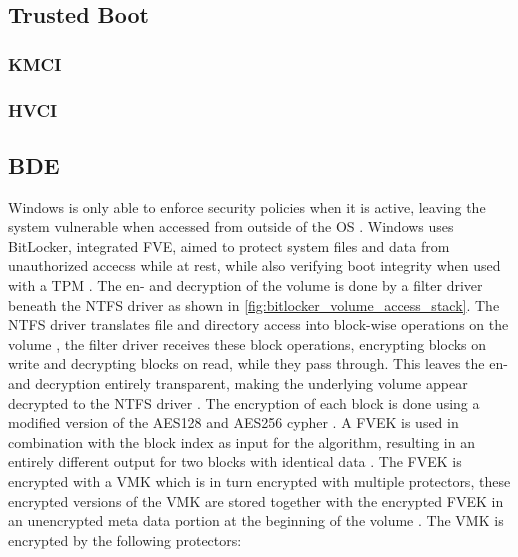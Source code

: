 \subsection{Trusted Boot}
\subsubsection{KMCI}
\subsubsection{HVCI}

\subsection{\acf{BDE}}
\label{sec:bde}
Windows is only able to enforce security policies when it is active, leaving the system vulnerable when accessed from outside of the \ac{OS} \cite[9. BitLocker Drive encryption]{windows-internals-6-part2}. Windows uses BitLocker, integrated \ac{FVE}, aimed to protect system files and data from unauthorized accecss while at rest\cite{microsoft-bitlocker-overview}, while also verifying boot integrity when used with a \ac{TPM} \cite[9. BitLocker Drive encryption]{windows-internals-6-part2}. The en- and decryption of the volume is done by a filter driver beneath the \ac{NTFS} driver as shown in \autoref{fig:bitlocker_volume_access_stack}. The \ac{NTFS} driver translates file and directory access into block-wise operations on the volume , the filter driver receives these block operations, encrypting blocks on write and decrypting blocks on read, while they pass through. This leaves the en- and decryption entirely transparent, making the underlying volume appear decrypted to the \ac{NTFS} driver \cite[9. Full-Volume Encryption Driver]{windows-internals-6-part2}. The encryption of each block is done using a modified version of the \ac{AES}128 and \ac{AES}256 cypher \cite[9. Encryption Keys]{windows-internals-6-part2}. A \ac{FVEK} is used in combination with the block index as input for the algorithm, resulting in an entirely different output for two blocks with identical data \cite[9. Full-Volume Encryption Driver]{windows-internals-6-part2}. The \ac{FVEK} is encrypted with a \ac{VMK} which is in turn encrypted with multiple protectors, these encrypted versions of the \ac{VMK} are stored together with the encrypted \ac{FVEK} in an unencrypted meta data portion at the beginning of the volume \cite[9. Encryption Keys]{windows-internals-6-part2}. The \ac{VMK} is encrypted by the following protectors:

